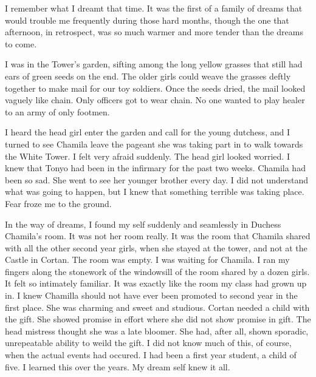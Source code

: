 \documentclass{article}
\begin{document}
I remember what I dreamt that time. It was the first of a family of dreams that would trouble me frequently during those hard months, though the one that afternoon, in retrospect, was so much warmer and more tender than the dreams to come. 
 
I was in the Tower's garden, sifting among the long yellow grasses that still had ears of green seeds on the end. The older girls could weave the grasses deftly together to make mail for our toy soldiers. Once the seeds dried, the mail looked vaguely like chain. Only officers got to wear chain. No one wanted to play healer to an army of only footmen. 

I heard the head girl enter the garden and call for the young dutchess, and I turned to see Chamila leave the pageant she was taking part in to walk towards the White Tower. I felt very afraid suddenly. The head girl looked worried. I knew that Tonyo had been in the infirmary for the past two weeks. Chamila had been so sad. She went to see her younger brother every day. I did not understand what was going to happen, but I knew that something terrible was taking place. Fear froze me to the ground. 

In the way of dreams, I found my self suddenly and seamlessly in Duchess Chamila's room. It was not her room really. It was the room that Chamila shared with all the other second year girls, when she stayed at the tower, and not at the Castle in Cortan. The room was empty. I was waiting for Chamila. I ran my fingers along the stonework of the windowsill of the room shared by a dozen girls. It felt so intimately familiar. It was exactly like the room my class had grown up in. I knew Chamilla should not have ever been promoted to second year in the first place. She was charming and sweet and studious. Cortan needed a child with the gift. She showed promise in effort where she did not show promise in gift. The head mistress thought she was a late bloomer. She had, after all, shown sporadic, unrepeatable ability to weild the gift. I did not know much of this, of course, when the actual events had occured. I had been a first year student, a child of five. I learned this over the years. My dream self knew it all.
\end{document}
